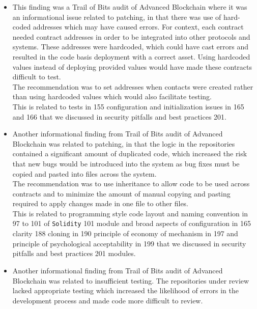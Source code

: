 \begin{itemize}
\item
  This finding was a Trail of Bits audit of Advanced Blockchain where it
  was an informational issue related to patching, in that there was use
  of hard-coded addresses which may have caused errors. For context,
  each contract needed contract addresses in order to be integrated into
  other protocols and systems. These addresses were hardcoded, which
  could have cast errors and resulted in the code basis deployment with
  a correct asset. Using hardcoded values instead of deploying provided
  values would have made these contracts difficult to test.\\

  The recommendation was to set addresses when contacts were created
  rather than using hardcoded values which would also facilitate
  testing.\\

  This is related to tests in 155 configuration and initialization
  issues in 165 and 166 that we discussed in security pitfalls and best
  practices 201.
\item
  Another informational finding from Trail of Bits audit of Advanced
  Blockchain was related to patching, in that the logic in the
  repositories contained a significant amount of duplicated code, which
  increased the risk that new bugs would be introduced into the system
  as bug fixes must be copied and pasted into files across the system.\\

  The recommendation was to use inheritance to allow code to be used
  across contracts and to minimize the amount of manual copying and
  pasting required to apply changes made in one file to other files.\\

  This is related to programming style code layout and naming convention
  in 97 to 101 of \texttt{Solidity} 101 module and broad aspects of
  configuration in 165 clarity 188 cloning in 190 principle of economy
  of mechanism in 197 and principle of psychological acceptability in
  199 that we discussed in security pitfalls and best practices 201
  modules.
\item
  Another informational finding from Trail of Bits audit of Advanced
  Blockchain was related to insufficient testing. The repositories under
  review lacked appropriate testing which increased the likelihood of
  errors in the development process and made code more difficult to
  review.\\


\end{itemize}
